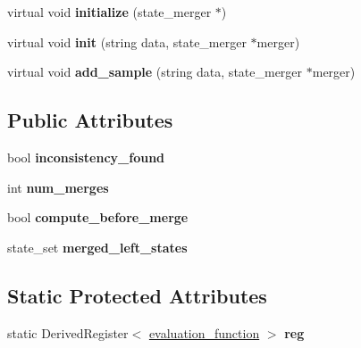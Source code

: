 \begin{DoxyCompactItemize}
\item 
virtual void {\bfseries initialize} (state\+\_\+merger $\ast$)\hypertarget{classevaluation__function_a93e73f2c3fcfeb7634c4f71b50938a83}{}\label{classevaluation__function_a93e73f2c3fcfeb7634c4f71b50938a83}

\item 
virtual void {\bfseries init} (string data, state\+\_\+merger $\ast$merger)\hypertarget{classevaluation__function_a09bd845a35f36363874c558bbbda8458}{}\label{classevaluation__function_a09bd845a35f36363874c558bbbda8458}

\item 
virtual void {\bfseries add\+\_\+sample} (string data, state\+\_\+merger $\ast$merger)\hypertarget{classevaluation__function_aa59695ebd759b964495f54bdc1303c22}{}\label{classevaluation__function_aa59695ebd759b964495f54bdc1303c22}

\end{DoxyCompactItemize}
\subsection*{Public Attributes}
\begin{DoxyCompactItemize}
\item 
bool {\bfseries inconsistency\+\_\+found}\hypertarget{classevaluation__function_a6631f0e603404c6c08c1a1fdd298932b}{}\label{classevaluation__function_a6631f0e603404c6c08c1a1fdd298932b}

\item 
int {\bfseries num\+\_\+merges}\hypertarget{classevaluation__function_a23fbdcc2f7a07e1d1428e61d5c5c267f}{}\label{classevaluation__function_a23fbdcc2f7a07e1d1428e61d5c5c267f}

\item 
bool {\bfseries compute\+\_\+before\+\_\+merge}\hypertarget{classevaluation__function_a1954a2b161d4da6148e288cb38ac8b59}{}\label{classevaluation__function_a1954a2b161d4da6148e288cb38ac8b59}

\item 
state\+\_\+set {\bfseries merged\+\_\+left\+\_\+states}\hypertarget{classevaluation__function_aff00baf1529b16519900b0f68afe8dad}{}\label{classevaluation__function_aff00baf1529b16519900b0f68afe8dad}

\end{DoxyCompactItemize}
\subsection*{Static Protected Attributes}
\begin{DoxyCompactItemize}
\item 
static Derived\+Register$<$ \hyperlink{classevaluation__function}{evaluation\+\_\+function} $>$ {\bfseries reg}\hypertarget{classevaluation__function_acb0655b008e5c52093692a4389f89a42}{}\label{classevaluation__function_acb0655b008e5c52093692a4389f89a42}

\end{DoxyCompactItemize}



